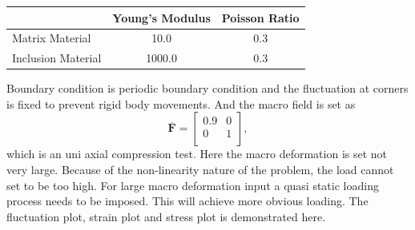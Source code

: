 \begin{center}
\begin{tabular}{l|c|c}
\hline
& Young's Modulus & Poisson Ratio \\
\hline
Matrix Material & 10.0 & 0.3 \\
Inclusion Material & 1000.0 & 0.3 \\
\hline
\end{tabular}
\end{center}
Boundary condition is periodic boundary condition and the fluctuation at corners is fixed to prevent rigid body movements. And the macro field is set as 
\[
\overbar{\mathbf{F}} = 
\begin{bmatrix}
0.9 & 0 \\
0 & 1 \\
\end{bmatrix},
\]
which is an uni axial compression test. Here the macro deformation is set not very large. Because of the non-linearity nature of the problem, the load cannot set to be too high. For large macro deformation input a quasi static loading process needs to be imposed. This will achieve more obvious loading. The fluctuation plot, strain plot and stress plot is demonstrated here.

